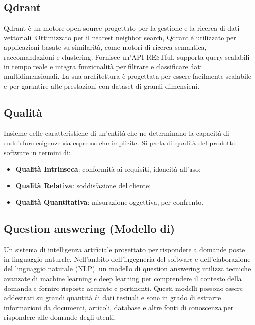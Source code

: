 \newpage



\section{}

\hypertarget{sec:qdrant}{}
\subsection*{Qdrant}
Qdrant è un motore open-source progettato per la gestione e la ricerca di dati vettoriali. Ottimizzato per il nearest neighbor search, Qdrant è utilizzato 
per applicazioni basate su similarità, come motori di ricerca semantica, raccomandazioni e clustering. Fornisce un'API RESTful, supporta query scalabili in 
tempo reale e integra funzionalità per filtrare e classificare dati multidimensionali. La sua architettura è progettata per essere facilmente scalabile e 
per garantire alte prestazioni con dataset di grandi dimensioni.

\hypertarget{sec:Qualità}{}
\subsection*{Qualità}
Insieme delle caratteristiche di un’entità che ne determinano la capacità di soddisfare esigenze sia espresse che implicite. Si parla di qualità del prodotto software in termini di:
\begin{itemize}
    \item \textbf{Qualità Intrinseca}: conformità ai requisiti, idoneità all’uso;
    \item \textbf{Qualità Relativa}: soddisfazione del cliente;
    \item \textbf{Qualità Quantitativa}: misurazione oggettiva, per confronto.
\end{itemize}

\hypertarget{sec:question_answering}{}
\subsection*{Question answering (Modello di)}
Un sistema di intelligenza artificiale progettato per rispondere a domande poste in linguaggio naturale. Nell'ambito dell'ingegneria 
del software e dell'elaborazione del linguaggio naturale (NLP), un modello di question answering utilizza tecniche avanzate di 
machine learning e deep learning per comprendere il contesto della domanda e fornire risposte accurate e pertinenti. Questi modelli 
possono essere addestrati su grandi quantità di dati testuali e sono in grado di estrarre informazioni da documenti, articoli, 
database e altre fonti di conoscenza per rispondere alle domande degli utenti.


